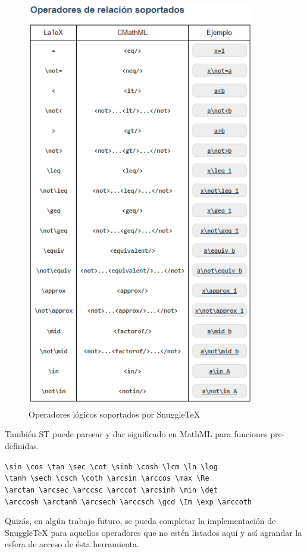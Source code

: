 \begin{figure}[H]
\centering
	\includegraphics[width=10cm, height=17.84cm]{Figures/reloperatorsoportados}
	\caption[]{Operadores lógicos soportados por SnuggleTeX}
\label{fig:opsoportados}
\end{figure}

También ST puede parsear y dar significado en MathML para funciones pre-definidas.

\begin{tcolorbox}
\verb|\sin \cos \tan \sec \cot \sinh \cosh \lcm \ln \log|\\
\verb|\tanh \sech \csch \coth \arcsin \arccos \max \Re| \\ 
\verb|\arctan \arcsec \arccsc \arccot \arcsinh \min \det|\\
\verb|\arccosh \arctanh \arcsech \arccsch \gcd \Im \exp \arccoth|
\end{tcolorbox}

Quizás, en algún trabajo futuro, se pueda completar la implementación de SnuggleTeX para aquellos operadores que no estén listados aquí y así agrandar la esfera de acceso de ésta herramienta.

